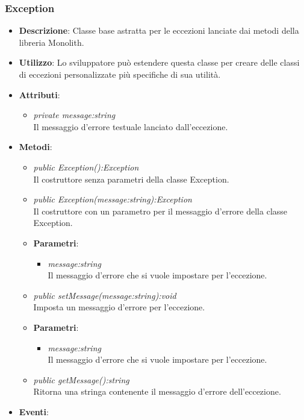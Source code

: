 \subsubsection{Exception}
\begin{itemize}
\item \textbf{Descrizione}: Classe base astratta per le eccezioni lanciate dai metodi della libreria Monolith.
\item \textbf{Utilizzo}: Lo sviluppatore può estendere questa classe per creare delle classi di eccezioni personalizzate più specifiche di sua utilità.
\item \textbf{Attributi}: 
	\begin{itemize}
	\item \textit{private message:string}\\
	Il messaggio d'errore testuale lanciato dall'eccezione.
	\end{itemize}
\item \textbf{Metodi}:
	\begin{itemize}
	\item \textit{public Exception():Exception}\\
	Il costruttore senza parametri della classe Exception.
	\item \textit{public Exception(message:string):Exception}\\
	Il costruttore con un parametro per il messaggio d'errore della classe Exception.
			\item{\textbf{Parametri}: \begin{itemize}
			\item \textit{message:string}\\
			Il messaggio d'errore che si vuole impostare per l'eccezione.
			\end{itemize}}
	\item \textit{public setMessage(message:string):void}\\
	Imposta un messaggio d'errore per l'eccezione.
			\item{\textbf{Parametri}: \begin{itemize}
			\item \textit{message:string}\\
			Il messaggio d'errore che si vuole impostare per l'eccezione.
			\end{itemize}}
	\item \textit{public getMessage():string}\\
	Ritorna una stringa contenente il messaggio d'errore dell'eccezione.
	\end{itemize}
\item \textbf{Eventi}:
\end{itemize}

